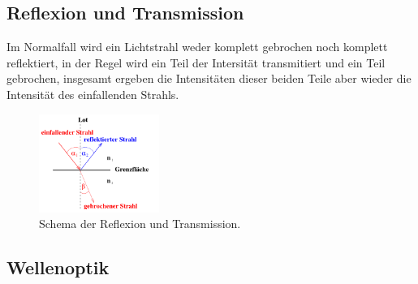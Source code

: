     \subsection{Reflexion und Transmission}

        \noindent Im Normalfall wird ein Lichtstrahl weder komplett gebrochen noch komplett reflektiert, in der Regel wird ein Teil der Intersität 
        transmitiert und ein Teil gebrochen, insgesamt ergeben die Intensitäten dieser beiden Teile aber wieder die Intensität des einfallenden 
        Strahls.

        \begin{figure}[H]
            \centering
            \includegraphics[width=0.35\textwidth]{latex/images/T4.PNG}
            \caption{Schema der Reflexion und Transmission\protect \cite{V400}.}
        \end{figure}

    \subsection{Wellenoptik}
        

